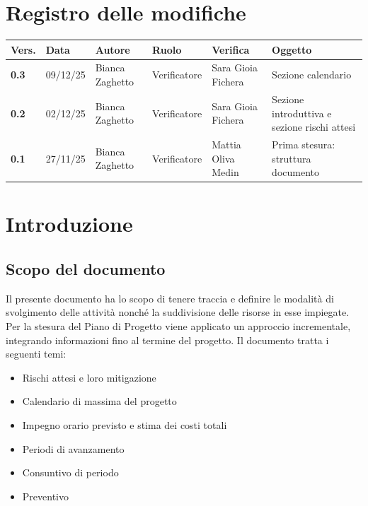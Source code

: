 \documentclass[a4paper,12pt]{article}
\begin{document}


\newpage
\section*{Registro delle modifiche}

\begin{table}[h!]
\begin{tabularx}{\textwidth}{|l|l|l|l|L|L|}
\hline
\textbf{Vers.} & \textbf{Data} & \textbf{Autore} & \textbf{Ruolo} & \textbf{Verifica} & \textbf{Oggetto} \\
\hline
\textbf{0.3} & 09/12/25 & Bianca Zaghetto & Verificatore & Sara Gioia Fichera & Sezione calendario \\
\hline
\textbf{0.2} & 02/12/25 & Bianca Zaghetto & Verificatore & Sara Gioia Fichera & Sezione introduttiva e sezione rischi attesi \\
\hline
\textbf{0.1} & 27/11/25 & Bianca Zaghetto & Verificatore & Mattia Oliva Medin & Prima stesura: struttura documento \\
\hline
\end{tabularx}
\end{table}

\newpage
\tableofcontents

\newpage
\listoffigures

\newpage
\listoftables

\newpage

\section{Introduzione}
    \subsection{Scopo del documento}
        Il presente documento ha lo scopo di tenere traccia e definire le modalità di svolgimento delle attività nonché la suddivisione delle risorse in esse impiegate.
        Per la stesura del Piano di Progetto viene applicato un approccio incrementale, integrando informazioni fino al termine del progetto. Il documento tratta i seguenti temi:
        \begin{itemize}
            \item Rischi attesi e loro mitigazione
            \item Calendario di massima del progetto
            \item Impegno orario previsto e stima dei costi totali
            \item Periodi di avanzamento
            \item Consuntivo di periodo
            \item Preventivo
        \end{itemize}
\end{document}
